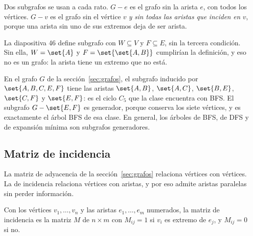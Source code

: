 \documentclass[11pt,letterpaper]{article}
\begin{document}
Dos subgrafos se usan a cada rato. $G - e$ es el grafo sin la arista
$e$, con todos los vértices. $G - v$ es el grafo sin el vértice $v$
\emph{y sin todas las aristas que inciden en $v$}, porque una arista
sin uno de sus extremos deja de ser arista.

\begin{ojo}
  La diapositiva 46 define subgrafo con $W \subseteq V$ y
  $F \subseteq E$, sin la tercera condición. Sin ella, $W = \set{A}$ y
  $F = \set{\set{A, B}}$ cumplirían la definición, y eso no es un
  grafo: la arista tiene un extremo que no está.
\end{ojo}

\begin{ejemplo}
  En el grafo $G$ de la sección~\ref{sec:grafos}, el subgrafo inducido
  por $\set{A, B, C, E, F}$ tiene las aristas $\set{A,B}$,
  $\set{A,C}$, $\set{B,E}$, $\set{C,F}$ y $\set{E,F}$: es el ciclo
  $C_5$ que la clase encuentra con BFS. El subgrafo $G - \set{E, F}$
  es generador, porque conserva los siete vértices, y es exactamente el
  árbol BFS de esa clase. En general, los árboles de BFS, de DFS y de
  expansión mínima son subgrafos generadores.
\end{ejemplo}


\subsection*{Matriz de incidencia}

La matriz de adyacencia de la sección~\ref{sec:grafos} relaciona
vértices con vértices. La de incidencia relaciona vértices con
aristas, y por eso admite aristas paralelas sin perder información.

\begin{definicion}
  \label{def:matriz-incidencia}
  Con los vértices $v_1, \dots, v_n$ y las aristas $e_1, \dots, e_m$
  numerados, la matriz de incidencia es la matriz $M$ de $n \times m$
  con $M_{ij} = 1$ si $v_i$ es extremo de $e_j$, y $M_{ij} = 0$ si no.
\end{definicion}
\end{document}
